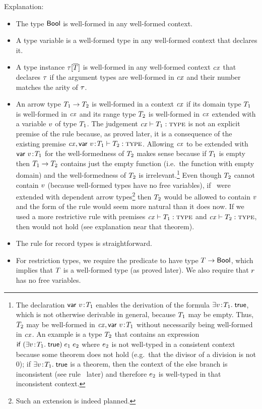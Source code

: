 Explanation:
\begin{itemize}
\item
The type $\mathsf{Bool}$ is well-formed in any well-formed context.
\item
A type variable is a well-formed type in any well-formed context that declares
it.
\item
A type instance $\tau[\overline{T}]$ is well-formed in any well-formed context $\mathit{cx}$ that
declares $\tau$ if the argument types are well-formed in $\mathit{cx}$ and their
number matches the arity of $\tau$.
\item
An arrow type $T_1\to T_2$ is well-formed in a context $\mathit{cx}$ if its domain type
$T_1$ is well-formed in $\mathit{cx}$ and its range type $T_2$ is well-formed in
$\mathit{cx}$ extended with a variable $v$ of type $T_1$. The judgement
$\mathit{cx}\vdash T_1:\textsc{type}$ is not an explicit premise of the rule because, as proved
later, it is a consequence of the existing premise
$\mathit{cx},\mathsf{var}\ v\!:\!T_1\vdash T_2:\textsc{type}$. Allowing $\mathit{cx}$ to be
extended with $\mathsf{var}\ v\!:\!T_1$ for the well-formedness of $T_2$ makes
sense because if $T_1$ is empty then $T_1\to T_2$ contains just the empty
function (i.e.\ the function with empty domain) and the well-formedness of
$T_2$ is irrelevant.\footnote{The declaration $\mathsf{var}\ v\!:\!T_1$ enables
the derivation of the formula $\exists v\!:\!T_1.\;\mathsf{true}$, which is not
otherwise derivable in general, because $T_1$ may be empty. Thus, $T_2$
may be well-formed in $\mathit{cx},\mathsf{var}\ v\!:\!T_1$ without necessarily
being well-formed in $\mathit{cx}$. An example is a type $T_2$ that contains an
expression $\mathsf{if}\;(\exists v\!:\!T_1.\;\mathsf{true})\;e_1\;e_2$ where
$e_2$ is not well-typed in a consistent context because some theorem does
not hold (e.g.\ that the divisor of a division is not 0); if
$\exists v\!:\!T_1.\;\mathsf{true}$ is a theorem, then the context of the else branch
is inconsistent (see rule \Reif\ later) and therefore $e_2$ is well-typed
in that inconsistent context.} Even though $T_2$ cannot contain $v$
(because well-formed types have no free variables), if \MS\ were extended with
dependent arrow types\footnote{Such an extension is indeed planned.} then
$T_2$ would be allowed to contain $v$ and the form of the rule would
seem more natural than it does now. If we used a more restrictive rule with
premises $\mathit{cx}\vdash T_1:\textsc{type}$ and $\mathit{cx}\vdash T_2:\textsc{type}$, then 
would not hold (see explanation near that theorem).
\item
The rule for record types is straightforward.
\item
For restriction types, we require the predicate to have type
$T\to\mathsf{Bool}$, which implies that $T$ is a well-formed type (as
proved later). We also require that $r$ has no free variables.
\end{itemize}

